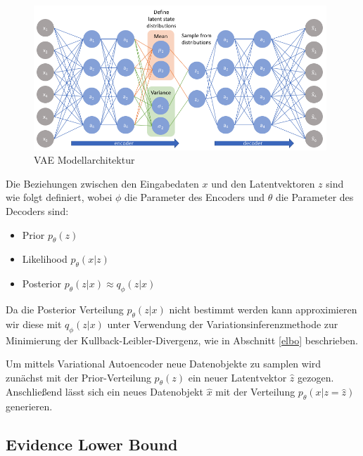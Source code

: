 \begin{figure}[h]
    \centering
    \includegraphics[width=11cm]{bilder/vae}
    \caption{VAE Modellarchitektur \citep{jordan_2018}}
    \label{vae_model}
\end{figure}
Die Beziehungen zwischen den Eingabedaten $x$ und den Latentvektoren $z$ sind wie folgt definiert, wobei $\phi$ die Parameter des Encoders und $\theta$ die Parameter des Decoders sind:
\begin{itemize}
\item Prior $p_\theta (z)$
\item Likelihood $p_\theta (x|z)$
\item Posterior $p_\theta (z|x)  \approx q_\phi (z|x)$
\end{itemize}

Da die Posterior Verteilung $p_\theta (z|x)$ nicht bestimmt werden kann approximieren wir diese mit $q_\phi (z|x)$ unter Verwendung der Variationsinferenzmethode zur Minimierung der Kullback-Leibler-Divergenz, wie in Abschnitt \ref{elbo} beschrieben.

Um mittels Variational Autoencoder neue Datenobjekte zu samplen wird zunächst mit der Prior-Verteilung $p_\theta (z)$ ein neuer Latentvektor $\hat{z}$ gezogen. Anschließend lässt sich ein neues Datenobjekt $\hat{x}$ mit der Verteilung $p_\theta (x|z=\hat{z})$ generieren.
\subsection{Evidence Lower Bound}

